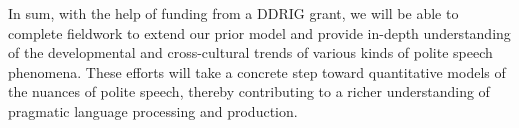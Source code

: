 \noindent In sum, with the help of funding from a DDRIG grant, we will be able to complete fieldwork to extend our prior model and provide in-depth understanding of the developmental and cross-cultural trends of various kinds of polite speech phenomena. These efforts will take a concrete step toward quantitative models of the nuances of polite speech, thereby contributing to a richer understanding of pragmatic language processing and production.


